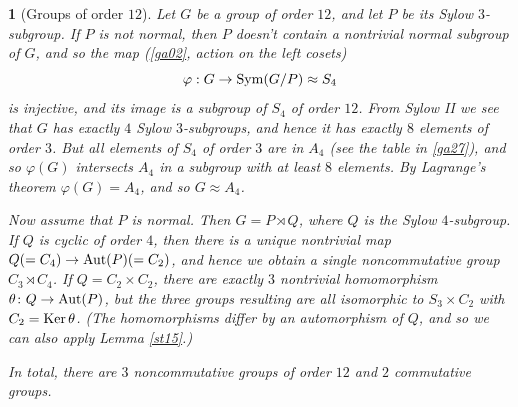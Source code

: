 \documentclass[a4paper,11pt,final,openany]{memoir}%
\newtheorem{plain}[X]{}
\theoremstyle{nonumberplain}
\begin{document}
\begin{plain}
[Groups of order $12$]\label{st18}%
%
Let $G$ be a group of order $12$, and let $P$ be its Sylow $3$-subgroup. If
$P$ is not normal, then $P$ doesn't contain a nontrivial normal subgroup of
$G$, and so the map (\ref{ga02}, action on the left cosets)
\[
\varphi:G\rightarrow\Sym(G/P)\approx S_{4}%
\]
is injective, and its image is a subgroup of $S_{4}$ of order $12$. From Sylow
II we see that $G$ has exactly $4$ Sylow $3$-subgroups, and hence it has
exactly $8$ elements of order $3$. But all elements of $S_{4}$ of order $3$
are in $A_{4}$ (see the table in \ref{ga27}), and so $\varphi(G)$ intersects
$A_{4}$ in a subgroup with at least $8$ elements. By Lagrange's theorem
$\varphi(G)=A_{4}$, and so $G\approx A_{4}$.

Now assume that $P$ is normal. Then $G=P\rtimes Q$, where $Q$ is the Sylow
$4$-subgroup. If $Q$ is cyclic of order $4$, then there is a unique nontrivial
map $Q(=C_{4})\rightarrow\operatorname{Aut}(P)(=C_{2})$, and hence we obtain a single
noncommutative group $C_{3}\rtimes C_{4}$. If $Q=C_{2}\times C_{2}$, there are
exactly $3$ nontrivial homomorphism $\theta\colon Q\rightarrow\operatorname{Aut}(P)$, but
the three groups resulting are all isomorphic to $S_{3}\times C_{2}$ with
$C_{2}=\operatorname{Ker}\theta$. (The homomorphisms differ by an automorphism of $Q$, and
so we can also apply Lemma \ref{st15}.)

In total, there are $3$ noncommutative groups of order $12$ and $2$
commutative groups.
\end{plain}
\end{document}
